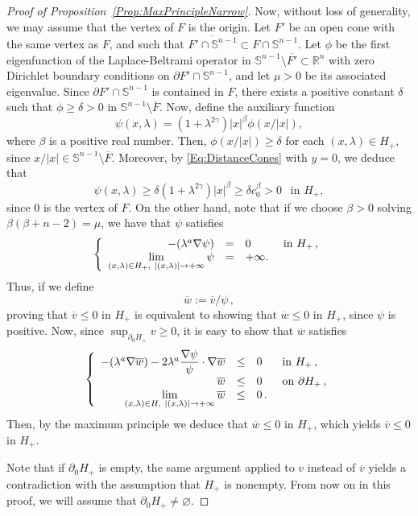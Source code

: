 \documentclass[12pt,reqno]{amsart}
\theoremstyle{definition}
\theoremstyle{remark}
\newcommand{\con}[1]{\mathbb{#1}}
\newcommand{\R}{\con{R}} %
\newcommand{\Sph}{\con{S}} %
\newcommand{\s}{\gamma}
\newcommand\beqc[1]{\left\{\begin{array}{#1}}
\newcommand\eeqc{\end{array} \right.}
\def\PDEsystem{rcll}
\let\div\relax
\DeclareMathOperator{\div}{div}
\def\ds{\displaystyle}
\numberwithin{equation}{section}
\begin{document}
\begin{proof}[Proof of Proposition~\ref{Prop:MaxPrincipleNarrow}]
Now, without loss of generality, we may assume that the vertex of $F$ is the origin. Let $F'$ be an open cone with the same vertex as $F$, and such that $\overline{F'\cap \Sph^{n-1}} \subset F\cap \Sph^{n-1}$. Let $\phi$ be the first eigenfunction of the Laplace-Beltrami operator in $\Sph^{n-1} \setminus \overline{F'}\subset \R^n$ with zero Dirichlet boundary conditions on $\partial F' \cap \Sph^{n-1}$, and let $\mu>0$ be its associated eigenvalue. Since $\partial F' \cap \Sph^{n-1}$ is contained in $F$, there exists a positive constant $\delta$ such that $\phi\geq \delta > 0$ in $\Sph^{n-1} \setminus \overline{F}$. Now, define the auxiliary function
$$ 
\psi(x,\lambda) = (1+\lambda^{2\s}) |x|^\beta \phi(x/|x|), 
$$
where $\beta$ is a positive real number. Then, $\phi(x/|x|)\geq \delta$ for each $(x,\lambda) \in H_+$,  since $x/|x| \in \Sph^{n-1} \setminus \overline{F}$. Moreover, by \eqref{Eq:DistanceCones} with $y=0$, we deduce that
$$ 
\psi(x,\lambda) \geq \delta (1+\lambda^{2\s}) |x|^\beta \geq \delta c_0^\beta > 0 \ \ \text{ in } H_+,
$$
since $0$ is the vertex of $F$.
On the other hand, note that if we choose $\beta>0$ solving $\beta(\beta+n-2)=\mu$, we have that $\psi$ satisfies
$$
\beqc{\PDEsystem}
-\div(\lambda^a \nabla \psi) &=& 0 & \text{ in } H_+\,, \\
\ds \lim_{(x,\lambda)\in H_+, \ |(x,\lambda)|\to +\infty} \psi & = & +\infty.
\eeqc
$$
Thus, if we define 
$$\overline{w}:=\overline{v}/\psi\,,$$
proving that $\overline{v} \leq 0$ in $H_+$ is equivalent to showing that $\overline{w}\leq 0$ in $H_+$, since $\psi$ is positive. Now, since $\sup_{\partial_0 H_+} v \geq 0$, it is easy to show that $\overline{w}$ satisfies
\begin{equation}
\label{Eq:wTildeEquationNarrow}
\beqc{\PDEsystem}
-\div(\lambda^a \nabla \overline{w})-2\lambda^a\dfrac{\nabla \psi}{\psi}\cdot\nabla \overline{w} &\leq& 0 & \text{ in } H_+\,, \\
\overline{w} &\leq& 0 & \text{ on } \partial H_+\,, \\
\ds \lim_{(x,\lambda)\in H, \ |(x,\lambda)|\to +\infty} \overline{w} & \leq & 0\,.
\eeqc
\end{equation}
Then, by the maximum principle we deduce that $\overline{w}\leq 0$ in $H_+$, which yields $\overline{v}\leq 0$ in $H_+$.

Note that if $\partial_0 H_+$ is empty, the same argument applied to $v$ instead of $\overline{v}$ yields a contradiction with the assumption that $H_+$ is nonempty. From now on in this proof, we will assume that $\partial_0 H_+ \neq \varnothing$.


\end{proof}
\end{document}
